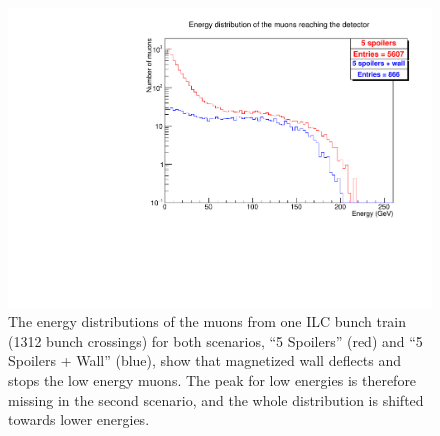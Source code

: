 \begin{figure}
    \centering
    \includegraphics[height=0.3\textheight]{figures/muon_energy.pdf}
    \caption[Energy distribution of muons from the two shielding scenarios]{
    The energy distributions of the muons from one ILC bunch train (1312 bunch crossings) for both scenarios, ``5 Spoilers'' (red) and ``5 Spoilers + Wall'' (blue), show that magnetized wall deflects and stops the low energy muons.
    The peak for low energies is therefore missing in the second scenario, and the whole distribution is shifted towards lower energies.
    }
    \label{fig:muon_energy}
\end{figure}
